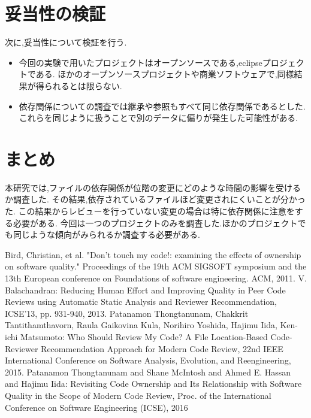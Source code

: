\documentclass[submit,ses,noauthor]{ipsj} %
\begin{document}
\section{妥当性の検証}\label{妥当性の検証}
次に,妥当性について検証を行う.
\begin{itemize}
\item 今回の実験で用いたプロジェクトはオープンソースである,eclipseプロジェクトである.
ほかのオープンソースプロジェクトや商業ソフトウェアで,同様結果が得られるとは限らない.

\item 依存関係についての調査では継承や参照もすべて同じ依存関係であるとした.
これらを同じように扱うことで別のデータに偏りが発生した可能性がある.


\end{itemize}


\section{まとめ} \label{まとめ}
本研究では,ファイルの依存関係が位階の変更にどのような時間の影響を受けるか調査した.
その結果,依存されているファイルほど変更されにくいことが分かった.
この結果からレビューを行っていない変更の場合は特に依存関係に注意をする必要がある.
今回は一つのプロジェクトのみを調査した.ほかのプロジェクトでも同じような傾向がみられるか調査する必要がある.



\begin{thebibliography}{10}
Bird, Christian, et al. "Don't touch my code!: examining the effects of ownership on software quality." Proceedings of the 19th ACM SIGSOFT symposium and the 13th European conference on Foundations of software engineering. ACM, 2011.
V. Balachandran: Reducing Human Effort and Improving Quality in Peer Code Reviews using Automatic Static Analysis and Reviewer Recommendation, ICSE'13, pp. 931-940, 2013.
Patanamon Thongtanunam, Chakkrit Tantithamthavorn, Raula Gaikovina Kula, Norihiro Yoshida, Hajimu Iida, Ken-ichi Matsumoto: Who Should Review My Code? A File Location-Based Code-Reviewer Recommendation Approach for Modern Code Review, 22nd IEEE International Conference on Software Analysis, Evolution, and Reengineering, 2015.
Patanamon Thongtanunam and Shane McIntosh and Ahmed E. Hassan and Hajimu Iida: Revisiting Code Ownership and Its Relationship with Software Quality in the Scope of Modern Code Review, Proc. of the International Conference on Software Engineering (ICSE), 2016
 \end{thebibliography}
\end{document}
